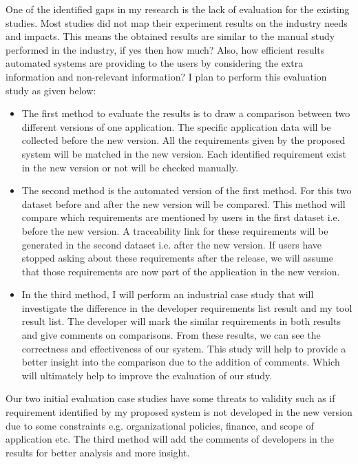 One of the identified gaps in my research is the lack of evaluation for the existing studies. Most studies did not map their experiment results on the industry needs and impacts. This means the obtained results are similar to the manual study performed in the industry, if yes then how much? Also, how efficient results automated systems are providing to the users by considering the extra information and non-relevant information? I plan to perform this evaluation study as given below: \\
\begin {itemize}
\item{The first method to evaluate the results is to draw a comparison between two different versions of one application. The specific application data will be collected before the new version. All the requirements given by the proposed system will be matched in the new version. Each identified requirement exist in the new version or not will be checked manually.\\}
\item{The second method is the automated version of the first method. For this two dataset before and after the new version will be compared. This method will compare which requirements are mentioned by users in the first dataset i.e. before the new version. A traceability link for these requirements will be generated in the second dataset i.e. after the new version. If users have stopped asking about these requirements after the release, we will assume that those requirements are now part of the application in the new version.\\}
\item{In the third method, I will perform an industrial case study that will investigate the difference in the developer requirements list result and my tool result list. The developer will mark the similar requirements in both results and give comments on comparisons. From these results, we can see the correctness and effectiveness of our system. This study will help to provide a better insight into the comparison due to the addition of comments. Which will ultimately help to improve the evaluation of our study.\\}
\end{itemize}
Our two initial evaluation case studies have some threats to validity such as if requirement identified by my proposed system is not developed in the new version due to some constraints e.g. organizational policies, finance, and scope of application etc. The third method will add the comments of developers in the results for better analysis and more insight.